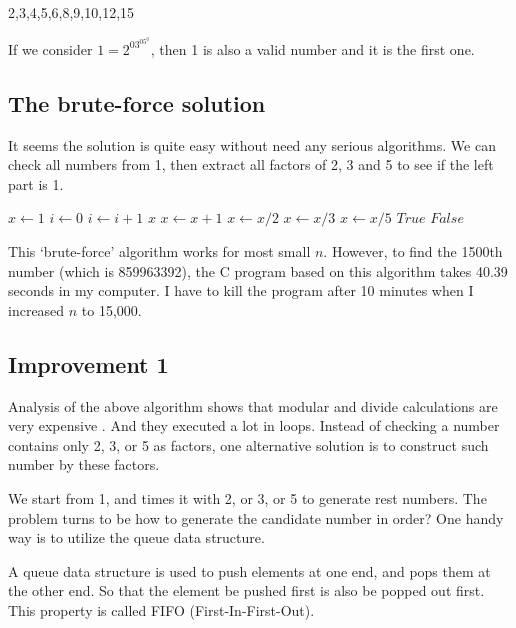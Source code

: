 \documentclass{article}
\begin{document}
2,3,4,5,6,8,9,10,12,15

If we consider $1=2^03^05^0$, then 1 is also a valid number and it is
the first one.

\subsection{The brute-force solution}
It seems the solution is quite easy without need any serious algorithms.
We can check all numbers from 1, then extract all factors of 2, 3 and 5
to see if the left part is 1.

\begin{algorithmic}[1]
  \State $x \gets 1$
  \State $i \gets 0$
  \Loop
      \State $i \gets i + 1$
        \State \Return $x$
      \EndIf
    \EndIf
    \State $x \gets x + 1$
  \EndLoop
\EndFunction
\Statex
{}
    \State $x \gets x / 2$
  \EndWhile
    \State $x \gets x / 3$
  \EndWhile
    \State $x \gets x / 5$
  \EndWhile
    \State \Return $True$
  \Else
    \State \Return $False$
  \EndIf
\EndFunction
\end{algorithmic}

This `brute-force' algorithm works for most small $n$. However, to find
the 1500th number (which is 859963392), the C program based on this
algorithm takes 40.39 seconds in my computer. I have to kill the program
after 10 minutes when I increased $n$ to 15,000.

\subsection{Improvement 1}
Analysis of the above algorithm shows that modular and divide calculations
are very expensive \cite{Bentley}. And they executed a lot in loops.
Instead of checking a number contains only 2, 3, or 5 as factors, one
alternative solution is to construct such number by these factors.

We start from 1, and times it with 2, or 3, or 5 to generate rest numbers.
The problem turns to be how to generate the candidate number in order?
One handy way is to utilize the queue data structure.

A queue data structure is used to push elements at one end, and pops
them at the other end. So that the element be pushed first is also
be popped out first. This property is called FIFO (First-In-First-Out).
\end{document}
